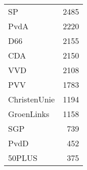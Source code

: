 \begin{tabular}{lr}
\toprule
SP           &  2485 \\
PvdA         &  2220 \\
D66          &  2155 \\
CDA          &  2150 \\
VVD          &  2108 \\
PVV          &  1783 \\
ChristenUnie &  1194 \\
GroenLinks   &  1158 \\
SGP          &   739 \\
PvdD         &   452 \\
50PLUS       &   375 \\
\bottomrule
\end{tabular}
